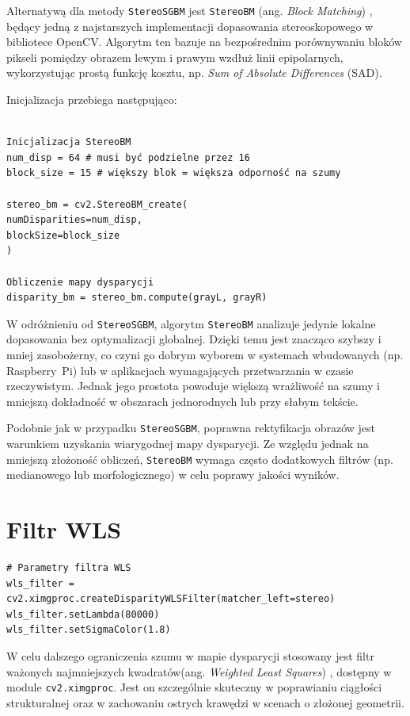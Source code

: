 \documentclass[magisterska]{pracadypl}
\begin{document}
Alternatywą dla metody \texttt{StereoSGBM} jest \texttt{StereoBM} (ang. \textit{Block Matching}) \cite{bm}, będący jedną z najstarszych implementacji dopasowania stereoskopowego w bibliotece OpenCV. Algorytm ten bazuje na bezpośrednim porównywaniu bloków pikseli pomiędzy obrazem lewym i prawym wzdłuż linii epipolarnych, wykorzystując prostą funkcję kosztu, np. \textit{Sum of Absolute Differences} (SAD).

Inicjalizacja przebiega następująco:

\begin{lstlisting}[style=mypython]

Inicjalizacja StereoBM
num_disp = 64 # musi być podzielne przez 16
block_size = 15 # większy blok = większa odporność na szumy

stereo_bm = cv2.StereoBM_create(
numDisparities=num_disp,
blockSize=block_size
)

Obliczenie mapy dysparycji
disparity_bm = stereo_bm.compute(grayL, grayR)
\end{lstlisting}

W odróżnieniu od \texttt{StereoSGBM}, algorytm \texttt{StereoBM} analizuje jedynie lokalne dopasowania bez optymalizacji globalnej. Dzięki temu jest znacząco szybszy i mniej zasobożerny, co czyni go dobrym wyborem w systemach wbudowanych (np. Raspberry~Pi) lub w aplikacjach wymagających przetwarzania w czasie rzeczywistym. Jednak jego prostota powoduje większą wrażliwość na szumy i mniejszą dokładność w obszarach jednorodnych lub przy słabym tekście.

Podobnie jak w przypadku \texttt{StereoSGBM}, poprawna rektyfikacja obrazów jest warunkiem uzyskania wiarygodnej mapy dysparycji. Ze względu jednak na mniejszą złożoność obliczeń, \texttt{StereoBM} wymaga często dodatkowych filtrów (np. medianowego lub morfologicznego) w celu poprawy jakości wyników.

\section{Filtr WLS}

\begin{lstlisting}[style=mypython]
# Parametry filtra WLS
wls_filter = cv2.ximgproc.createDisparityWLSFilter(matcher_left=stereo)
wls_filter.setLambda(80000)
wls_filter.setSigmaColor(1.8)
\end{lstlisting}

W celu dalszego ograniczenia szumu w mapie dysparycji stosowany jest filtr ważonych najmniejszych kwadratów(ang. \textit{Weighted Least Squares}) \cite{wls}, dostępny w module \texttt{cv2.ximgproc}. Jest on szczególnie skuteczny w poprawianiu ciągłości strukturalnej oraz w zachowaniu ostrych krawędzi w scenach o złożonej geometrii.
\end{document}
